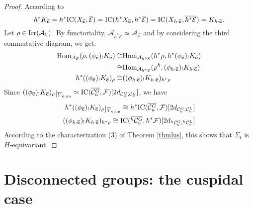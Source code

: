 \documentclass[11pt]{amsart}
\theoremstyle{definition}
\def\Hom{{\rm Hom}}
\def\Irr{{\rm Irr}}
\def\ft{{\mathfrak t}}
\def\uni{{\rm un}}
\def\IC{{\rm{IC}}}
\def\restriction#1#2{\mathchoice
              {\setbox1\hbox{${\displaystyle #1}_{\scriptstyle #2}$}
              \restrictionaux{#1}{#2}}
              {\setbox1\hbox{${\textstyle #1}_{\scriptstyle #2}$}
              \restrictionaux{#1}{#2}}
              {\setbox1\hbox{${\scriptstyle #1}_{\scriptscriptstyle #2}$}
              \restrictionaux{#1}{#2}}
              {\setbox1\hbox{${\scriptscriptstyle #1}_{\scriptscriptstyle #2}$}
              \restrictionaux{#1}{#2}}}
\def\restrictionaux#1#2{{#1\,\smash{\vrule height .8\ht1 depth .85\dp1}}_{\,#2}}
\begin{document}
\begin{proof}
According to \cite[Proposition 5.4]{Gor}
\[
h^{*} K_{\overline{\mathbf{c}}} = 
h^{*} \IC(X_{\overline{\mathbf{c}}},\overline{\mathcal{E}}) = \IC(h^{*} 
X_{\overline{\mathbf{c}}},h^{*} \overline{\mathcal{E}}) = \IC (X_{h \cdot 
\overline{\mathbf{c}}},\overline{h^{*}  \mathcal{E}}) = K_{h \cdot \overline{\mathbf{c}}}.
\]
Let $\rho \in \Irr(\mathcal{A}_{\mathcal{E}})$. By functoriality, 
$\mathcal{A}_{h^{*} \mathcal{E}} \simeq \mathcal{A}_{\mathcal{E}}$ and by considering 
the third commutative diagram, we get:
\begin{eqnarray*}
\Hom_{\mathcal{A}_{\mathcal{E}}}(\rho,(\phi_{\overline{\mathbf{c}}})_{!}
K_{\overline{\mathbf{c}}})  \cong & \Hom_{\mathcal{A}_{h^{*} \mathcal{E}}}(h^{*} \rho,
h^{*}  (\phi_{\overline{\mathbf{c}}})_{!}K_{\overline{\mathbf{c}}})\\
\cong &  \Hom_{\mathcal{A}_{h^{*} \mathcal{E}}}(\rho^{h}, (\phi_{h \cdot 
\overline{\mathbf{c}}})_{!}K_{h \cdot\overline{\mathbf{c}}}) \\
h^{*} ((\phi_{\overline{\mathbf{c}}})_{!}K_{\overline{\mathbf{c}}})_{\rho} \cong & 
((\phi_{h \cdot \overline{\mathbf{c}}})_{!}K_{h \cdot \overline{\mathbf{c}}})_{h^{*} \rho}
\end{eqnarray*}
Since $\restriction{((\phi_{\overline{\mathbf{c}}})_{!}K_{\overline{\mathbf{c}}})_{\rho}}
{\overline{Y}_{\mathbf{c},\uni}} \simeq \IC(\overline{\mathcal{C}_{u}^{G}},
\mathcal{F})[2d_{\mathcal{C}_{u}^{G},\mathcal{C}_{v}^{L}}]$, we have 
\begin{eqnarray*}
h^{*}\restriction{((\phi_{\overline{\mathbf{c}}})_{!}K_{\overline{\mathbf{c}}})_{\rho}}{
\overline{Y}_{\mathbf{c},\uni}} \cong h^{*} \IC(\overline{\mathcal{C}_{u}^{G}},
\mathcal{F})[2d_{\mathcal{C}_{u}^{G},\mathcal{C}_{v}^{L}}]\\
((\phi_{h \cdot \overline{\mathbf{c}}})_{!}K_{h \cdot \overline{\mathbf{c}}})_{h^{*} \rho} 
\cong \IC(\overline{{}^h\mathcal{C}_{u}^{G}},h^{*} \mathcal{F})[2d_{{}^{h} 
\mathcal{C}_{u}^{G},{}^{h} \mathcal{C}_{v}^{L}}]
\end{eqnarray*}
According to the characterization (3) of Theorem \ref{thmlus}, this shows that 
$\Sigma_{\ft}$ is $H$-equivariant.
\end{proof}



\section{Disconnected groups: the cuspidal case}
\label{sec:cusp}
\end{document}
